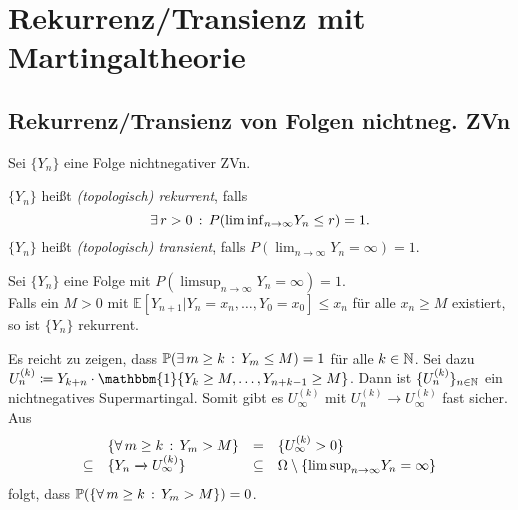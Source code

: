 \documentclass{cheat-sheet}
\renewcommand{\P}{\mathbb{P}} %
\newcommand{\E}{\mathbb{E}} %
\newcommand{\ind}{\mathbbm{1}} %
\begin{document}
\section{Rekurrenz/Transienz mit Martingaltheorie}

\subsection{Rekurrenz/Transienz von Folgen nichtneg. ZVn}

\begin{setting}
  Sei $\{ Y_n \}$ eine Folge nichtnegativer ZVn.
\end{setting}

\begin{defn}
  $\{ Y_n \}$ heißt \emph{(topologisch) rekurrent}, falls
  \[ \exists \, {r > 0} \,:\, P({\liminf}_{n \to \infty} Y_n \leq r) = 1. \]
  $\{ Y_n \}$ heißt \emph{(topologisch) transient}, falls $P({\lim}_{n \to \infty} Y_n = \infty) = 1$.
\end{defn}

\begin{satz}
  Sei $\{ Y_n \}$ eine Folge mit $P({\limsup}_{n \to \infty} Y_n = \infty) = 1$. \\
  Falls ein $M > 0$ mit $\E[ Y_{n+1} | Y_n = x_n, \ldots, Y_0 = x_0 ] \leq x_n$ für alle $x_n \geq M$ existiert, so ist $\{ Y_n \}$ rekurrent.
\end{satz}

\begin{beweisskizze}
  Es reicht zu zeigen, dass $\P(\ex{m \geq k} Y_m \leq M) = 1$ für alle $k \in \mathbb{N}$.
  Sei dazu $U_n^{(k)} \coloneqq Y_{k+n} \cdot \ind \{ Y_k \geq M, \ldots, Y_{n+k-1} \geq M \}$.
  Dann ist $\{ U_n^{(k)} \}_{n \in \mathbb{N}}$ ein nichtnegatives Supermartingal.
  Somit gibt es $U_\infty^{(k)}$ mit $U_n^{(k)} \to U_\infty^{(k)}$ fast sicher.
  Aus
  \[
    \begin{array}{r l c l}
      & \{ \forall \, {m \geq k} \,:\, Y_m > M \} &=& \{ U_\infty^{(k)} > 0 \} \\
      \subseteq& \{ Y_n \xrightarrow{} U_\infty^{(k)} \} &\subseteq& \Omega \setminus \{ {\limsup}_{n \to \infty} Y_n = \infty \}
    \end{array}
  \]
  folgt, dass $\P(\{ \fa{m \geq k} Y_m > M \}) = 0$.
\end{beweisskizze}

\end{document}
